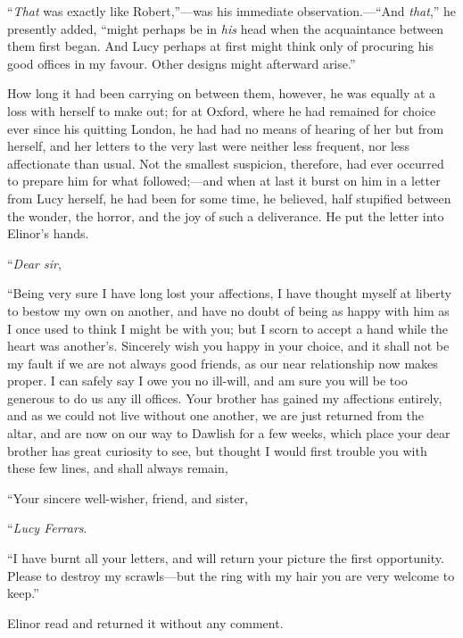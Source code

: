 ``\emph{That} was exactly like Robert,''---was his immediate
observation.---``And \emph{that},'' he presently added, ``might
perhaps be in \emph{his} head when the acquaintance between
them first began.  And Lucy perhaps at first might
think only of procuring his good offices in my favour.
Other designs might afterward arise.''

How long it had been carrying on between them,
however, he was equally at a loss with herself to make out;
for at Oxford, where he had remained for choice ever since
his quitting London, he had had no means of hearing of her
but from herself, and her letters to the very last were
neither less frequent, nor less affectionate than usual.
Not the smallest suspicion, therefore, had ever occurred
to prepare him for what followed;---and when at last it
burst on him in a letter from Lucy herself, he had been
for some time, he believed, half stupified between
the wonder, the horror, and the joy of such a deliverance.
He put the letter into Elinor's hands.

\bigskip
     ``\emph{Dear sir},
\medskip

     ``Being very sure I have long lost your affections,
     I have thought myself at liberty to bestow my own
     on another, and have no doubt of being as happy with
     him as I once used to think I might be with you;
     but I scorn to accept a hand while the heart was
     another's.  Sincerely wish you happy in your choice,
     and it shall not be my fault if we are not always
     good friends, as our near relationship now makes
     proper.  I can safely say I owe you no ill-will,
     and am sure you will be too generous to do us any
     ill offices.  Your brother has gained my affections
     entirely, and as we could not live without one
     another, we are just returned from the altar, and
     are now on our way to Dawlish for a few weeks, which
     place your dear brother has great curiosity to see,
     but thought I would first trouble you with these
     few lines, and shall always remain,

\medskip
     ``Your sincere well-wisher, friend, and sister,

\medskip
                                        ``\emph{Lucy Ferrars}.

\medskip
     ``I have burnt all your letters, and will return
     your picture the first opportunity.  Please to destroy
     my scrawls---but the ring with my hair you are very
     welcome to keep.''
\bigskip

Elinor read and returned it without any comment.

